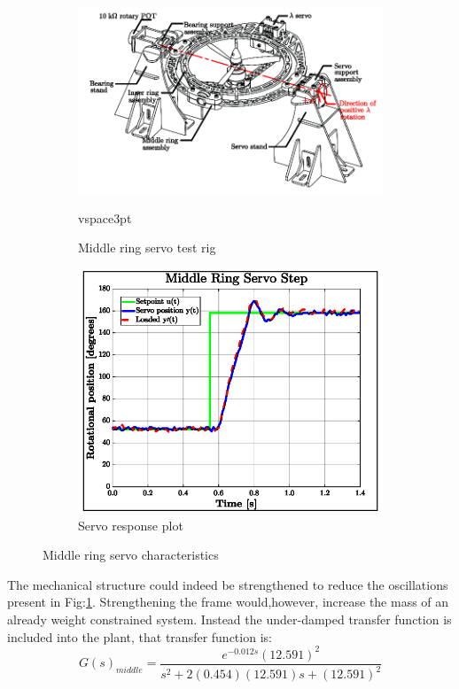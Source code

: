 \begin{figure}[hbtp]
\vspace{-4pt}
\centering
\begin{subfigure}{0.88\textwidth}
\centering
\includegraphics[width=\textwidth]{figs/servo-middle}
\vspace{-12pt}
\caption{Middle ring servo test rig}
\label{fig:servo-middle}
vspace{3pt}
\end{subfigure}
\par
\begin{subfigure}{0.49\textwidth}
\centering
\includegraphics[width=\textwidth]{graphs/servo-step-middle}
\vspace{-10pt}
\caption{Servo response plot}
\label{fig:servo-step-middle}
\end{subfigure}
\vspace{-8pt}
\caption{Middle ring servo characteristics}
\label{fig:servo-middle-character}
\vspace{-18pt}
\end{figure}
\par
The mechanical structure could indeed be strengthened to reduce the oscillations present in Fig:\ref{fig:servo-middle}. Strengthening the frame would,however, increase the mass of an already weight constrained system. Instead the under-damped transfer function is included into the plant, that transfer function is:
\begin{equation}\label{eq:servo-transfer-middle}
G(s)_{middle}=\frac{e^{-0.012s}(12.591)^2}{s^2+2(0.454)(12.591)s+(12.591)^2}
\end{equation}
